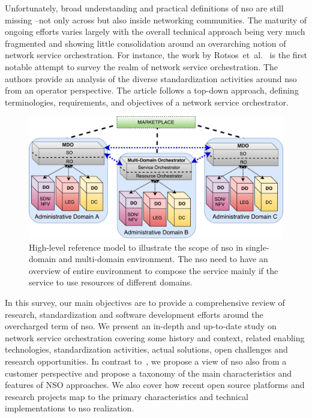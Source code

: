 Unfortunately,  broad understanding and practical definitions of \gls{nso} are still missing --not only across but also inside networking communities. The maturity of ongoing efforts varies largely with the overall technical approach being very much fragmented and showing little consolidation around an overarching notion of network service orchestration. For instance, the work by Rotsos~et~al.~\cite{Rotsos2017NetworkSurvey} is the first notable attempt to survey the realm of network service orchestration. The authors provide an analysis of the diverse standardization activities around \gls{nso} from an operator perspective. The article follows a top-down approach, defining terminologies, requirements, and objectives of a network service orchestrator. 

\begin{figure}[th]
  \centering
  \includegraphics[scale=.6]{Figures/01_Introduction/nso}
    \caption{High-level reference model to illustrate the scope of \acrfull{nso} in single-domain and multi-domain environment. The \gls{nso} need to have an overview of entire environment to compose the service mainly if the service to use resources of different domains.}
    \label{mdo}
\end{figure}

In this survey, our main objectives are to provide a comprehensive review of research, standardization and software development efforts around the overcharged term of  \acrlong{nso}. We present an in-depth and up-to-date study on network service orchestration covering some history and context, related enabling technologies, standardization activities, actual  solutions, open challenges and  research opportunities. In contrast to~\cite{Rotsos2017NetworkSurvey}, we propose a view of \gls{nso} also from a customer perspective and propose a taxonomy of the main characteristics and features of NSO approaches. We also cover how recent open source platforms and research projects map to the primary characteristics and technical implementations to \gls{nso} realization.    

